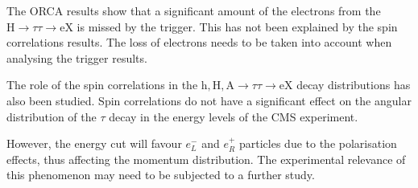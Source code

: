 \documentclass[a4paper,12pt,titlepage]{article}
\begin{document}
The ORCA results show that a significant amount of the electrons from the $\mathrm{H} \rightarrow \tau \tau \rightarrow \mathrm{eX}$ is missed by the trigger. This has not been explained by the spin correlations results. The loss of electrons needs to be taken into account when analysing the trigger results.

The role of the spin correlations in the $\mathrm{h, H, A} \rightarrow \tau \tau \rightarrow \mathrm{eX}$ decay distributions has also been studied. Spin correlations do not have a significant effect on the angular distribution of the $\tau$ decay in the energy levels of the CMS experiment.

However, the energy cut will favour $e_L^-$ and $e_R^+$ particles due to the polarisation effects, thus affecting the momentum distribution. The experimental relevance of this phenomenon may need to be subjected to a further study.

\pagebreak
\end{document}
